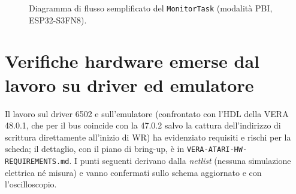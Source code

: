 \documentclass[12pt, a4paper]{article}
\begin{document}
\begin{figure}[H]
\caption{Diagramma di flusso semplificato del \texttt{MonitorTask} (modalità PBI, ESP32-S3FN8).}
\label{fig:flowchart}
\end{figure}

\section{Verifiche hardware emerse dal lavoro su driver ed emulatore}
\label{sec:hwverif}
Il lavoro sul driver 6502 e sull'emulatore (confrontato con l'HDL della VERA 48.0.1, che per il bus coincide con la 47.0.2 salvo la cattura dell'indirizzo di scrittura direttamente all'inizio di WR) ha evidenziato requisiti e rischi per la scheda; il dettaglio, con il piano di bring-up, è in \texttt{VERA-ATARI-HW-REQUIREMENTS.md}. I punti seguenti derivano dalla \emph{netlist} (nessuna simulazione elettrica né misura) e vanno confermati sullo schema aggiornato e con l'oscilloscopio.
\end{document}
